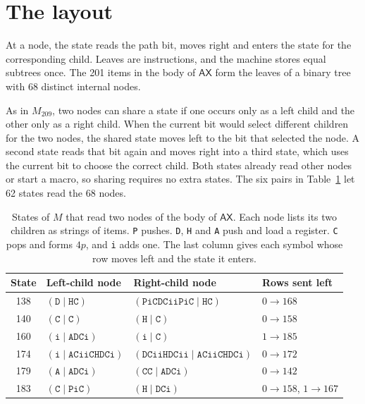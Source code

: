 \documentclass[11pt,letterpaper]{article}
\newcommand{\ax}{\mathsf{AX}}
\begin{document}
\section{The layout}\label{sec:layout}

At a node, the state reads the path bit, moves right and enters the
state for the corresponding child. Leaves are instructions, and
the machine stores equal subtrees once. The 201 items in the body of
$\ax$ form the leaves of a binary tree with 68 distinct internal
nodes.

As in $M_{209}$, two nodes can share a state if one occurs only as a
left child and the other only as a right child. When the current bit
would select different children for the two nodes, the shared state
moves left to the bit that selected the node. A second state reads
that bit again and moves right into a third state, which uses the
current bit to choose the correct child. Both states already read
other nodes or start a macro, so sharing requires no extra states.
The six pairs in Table~\ref{tab:shared} let 62 states read the 68
nodes.

\begin{table}[ht]
\centering\small
\begin{tabular}{@{}clll@{}}
\toprule
State & Left-child node & Right-child node & Rows sent left \\
\midrule
138 & $(\mathtt{D}\mid\mathtt{HC})$ & $(\mathtt{PiCDCiiPiC}\mid\mathtt{HC})$ & $0\to168$ \\
140 & $(\mathtt{C}\mid\mathtt{C})$ & $(\mathtt{H}\mid\mathtt{C})$ & $0\to158$ \\
160 & $(\mathtt{i}\mid\mathtt{ADCi})$ & $(\mathtt{i}\mid\mathtt{C})$ & $1\to185$ \\
174 & $(\mathtt{i}\mid\mathtt{ACiiCHDCi})$ & $(\mathtt{DCiiHDCii}\mid\mathtt{ACiiCHDCi})$ & $0\to172$ \\
179 & $(\mathtt{A}\mid\mathtt{ADCi})$ & $(\mathtt{CC}\mid\mathtt{ADCi})$ & $0\to142$ \\
183 & $(\mathtt{C}\mid\mathtt{PiC})$ & $(\mathtt{H}\mid\mathtt{DCi})$ & $0\to158$, $1\to167$ \\
\bottomrule
\end{tabular}
\caption{States of $M$ that read two nodes of the body of $\ax$.
Each node lists its two children as strings of items. \texttt{P}
pushes. \texttt{D}, \texttt{H} and \texttt{A} push and load a
register. \texttt{C} pops and forms $4p$, and \texttt{i} adds one.
The last column gives each symbol whose row moves left and the
state it enters.}\label{tab:shared}
\end{table}
\end{document}
